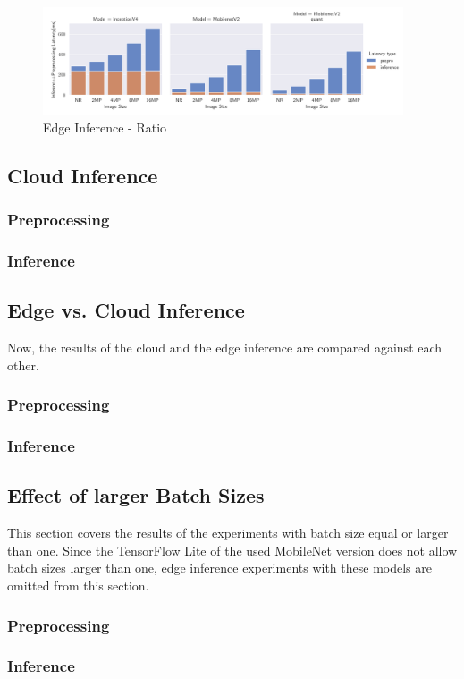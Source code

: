 \begin{figure}[H]
\centering
\includegraphics[width=0.95\textwidth]{./Bilder/single_plots/edge_inference_plots/Edge_Preprocessing_+_Inference.pdf}
\caption{Edge Inference - Ratio}
\label{fig:EdgeInferenceRatio}
\end{figure}

\subsection{Cloud Inference}
\subsubsection{Preprocessing}
\subsubsection{Inference}
\subsection{Edge vs. Cloud Inference}
Now, the results of the cloud and the edge inference are compared against each other.
\subsubsection{Preprocessing}
\subsubsection{Inference}

\subsection{Effect of larger Batch Sizes}
This section covers the results of the experiments with batch size equal or larger than one. Since the TensorFlow Lite of the used MobileNet version does not allow batch sizes larger than one, edge inference experiments with these models are omitted from this section.
\subsubsection{Preprocessing}
\subsubsection{Inference}




\endinput 
